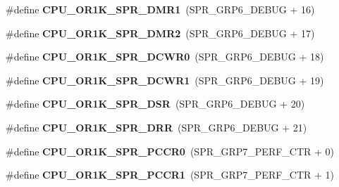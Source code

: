 \begin{DoxyCompactItemize}
\item 
\mbox{\label{or1k-utility_8h_a71338b8a28dd3a3b2071efe1d2dd3f56}} 
\#define {\bfseries C\+P\+U\+\_\+\+O\+R1\+K\+\_\+\+S\+P\+R\+\_\+\+D\+M\+R1}~(S\+P\+R\+\_\+\+G\+R\+P6\+\_\+\+D\+E\+B\+UG + 16)
\item 
\mbox{\label{or1k-utility_8h_ab0dc5344a9206104447bca978183cc0b}} 
\#define {\bfseries C\+P\+U\+\_\+\+O\+R1\+K\+\_\+\+S\+P\+R\+\_\+\+D\+M\+R2}~(S\+P\+R\+\_\+\+G\+R\+P6\+\_\+\+D\+E\+B\+UG + 17)
\item 
\mbox{\label{or1k-utility_8h_a30bc19e2bc34438f7b0fdf294f8a9300}} 
\#define {\bfseries C\+P\+U\+\_\+\+O\+R1\+K\+\_\+\+S\+P\+R\+\_\+\+D\+C\+W\+R0}~(S\+P\+R\+\_\+\+G\+R\+P6\+\_\+\+D\+E\+B\+UG + 18)
\item 
\mbox{\label{or1k-utility_8h_a24c7b884625b489f19806f4a98bfe68d}} 
\#define {\bfseries C\+P\+U\+\_\+\+O\+R1\+K\+\_\+\+S\+P\+R\+\_\+\+D\+C\+W\+R1}~(S\+P\+R\+\_\+\+G\+R\+P6\+\_\+\+D\+E\+B\+UG + 19)
\item 
\mbox{\label{or1k-utility_8h_a81a686499a2a60c99da49912331925c0}} 
\#define {\bfseries C\+P\+U\+\_\+\+O\+R1\+K\+\_\+\+S\+P\+R\+\_\+\+D\+SR}~(S\+P\+R\+\_\+\+G\+R\+P6\+\_\+\+D\+E\+B\+UG + 20)
\item 
\mbox{\label{or1k-utility_8h_acda57dc1a2499f55bbc9a697b5546648}} 
\#define {\bfseries C\+P\+U\+\_\+\+O\+R1\+K\+\_\+\+S\+P\+R\+\_\+\+D\+RR}~(S\+P\+R\+\_\+\+G\+R\+P6\+\_\+\+D\+E\+B\+UG + 21)
\item 
\mbox{\label{or1k-utility_8h_a2e6dee0c00e303898a184812761f166d}} 
\#define {\bfseries C\+P\+U\+\_\+\+O\+R1\+K\+\_\+\+S\+P\+R\+\_\+\+P\+C\+C\+R0}~(S\+P\+R\+\_\+\+G\+R\+P7\+\_\+\+P\+E\+R\+F\+\_\+\+C\+TR + 0)
\item 
\mbox{\label{or1k-utility_8h_a08601bd9e81efc584326089124406a45}} 
\#define {\bfseries C\+P\+U\+\_\+\+O\+R1\+K\+\_\+\+S\+P\+R\+\_\+\+P\+C\+C\+R1}~(S\+P\+R\+\_\+\+G\+R\+P7\+\_\+\+P\+E\+R\+F\+\_\+\+C\+TR + 1)
\item 
\mbox{\label{or1k-utility_8h_acf2e24923cc3afafc7589b427abb79a9}} 

\end{DoxyCompactItemize}
